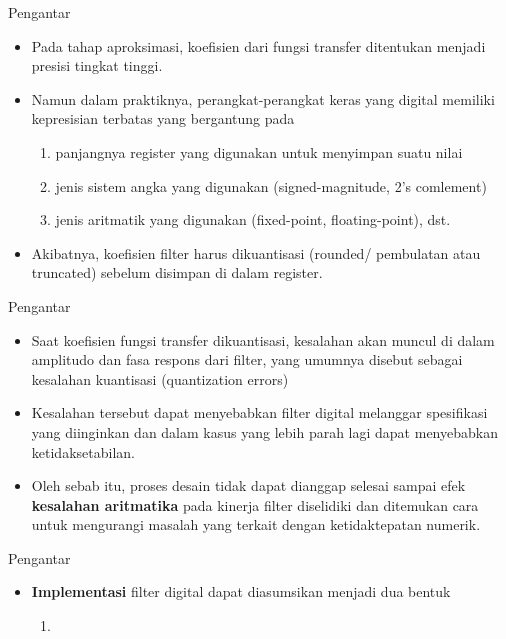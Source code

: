 \documentclass[pdflatex,compress,mathserif]{beamer}
\begin{document}
\begin{frame}{Pengantar}
	\begin{itemize}
		\item Pada tahap aproksimasi, koefisien dari fungsi transfer ditentukan menjadi presisi tingkat tinggi.
		\item Namun dalam praktiknya, perangkat-perangkat keras yang digital memiliki kepresisian terbatas yang bergantung pada
		\begin{enumerate}
			\item panjangnya register yang digunakan untuk menyimpan suatu nilai
			\item jenis sistem angka yang digunakan (signed-magnitude, 2's comlement)
			\item jenis aritmatik yang digunakan (fixed-point, floating-point), dst.
		\end{enumerate}
		\item Akibatnya, koefisien filter harus dikuantisasi (rounded/ pembulatan atau truncated) sebelum disimpan di dalam register.
	\end{itemize}
\end{frame}

\begin{frame}{Pengantar}
	\begin{itemize}
		\item Saat koefisien fungsi transfer dikuantisasi, kesalahan akan muncul di dalam amplitudo dan fasa respons dari filter, yang umumnya disebut sebagai kesalahan kuantisasi (quantization errors)
		\item Kesalahan tersebut dapat menyebabkan filter digital melanggar spesifikasi yang diinginkan dan dalam kasus yang lebih parah lagi dapat menyebabkan ketidaksetabilan.
		\item Oleh sebab itu, proses desain tidak dapat dianggap selesai sampai efek \textbf{kesalahan aritmatika} pada kinerja filter diselidiki dan ditemukan cara untuk mengurangi masalah yang terkait dengan ketidaktepatan numerik.
	\end{itemize}
\end{frame}

\begin{frame}{Pengantar}
	\begin{itemize}
		\item \textbf{Implementasi} filter digital dapat diasumsikan menjadi dua bentuk
		\begin{enumerate}
			\item 
		\end{enumerate}
	\end{itemize}
\end{frame}
\end{document}
